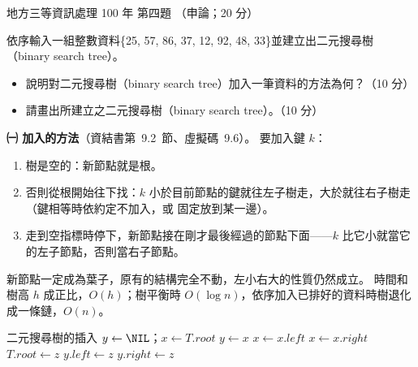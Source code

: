 \begin{pastexam}[label={px:df3-100-ds-04}]{地方三等資訊處理 100 年 第四題}
（申論；20 分）

依序輸入一組整數資料\{25, 57, 86, 37, 12, 92, 48, 33\}並建立出二元搜尋樹（binary search tree）。
\begin{itemize}[leftmargin=2.2em, nosep]
\item[㈠] 說明對二元搜尋樹（binary search tree）加入一筆資料的方法為何？（10 分）
\item[㈡] 請畫出所建立之二元搜尋樹（binary search tree）。（10 分）
\end{itemize}
\end{pastexam}

\begin{pastsoln}
\textbf{㈠ 加入的方法}（資結書第~9.2~節、虛擬碼~9.6）。 要加入鍵 $k$：
\begin{enumerate}
\item 樹是空的：新節點就是根。
\item 否則從根開始往下找：$k$ 小於目前節點的鍵就往左子樹走，大於就往右子樹走（鍵相等時依約定不加入，或
固定放到某一邊）。
\item 走到空指標時停下，新節點接在剛才最後經過的節點下面——$k$ 比它小就當它的左子節點，否則當右子節點。
\end{enumerate}
新節點一定成為葉子，原有的結構完全不動，左小右大的性質仍然成立。 時間和樹高 $h$ 成正比，$O(h)$；樹平衡時
$O(\log n)$，依序加入已排好的資料時樹退化成一條鏈，$O(n)$。
\begin{pseudo}{二元搜尋樹的插入}
 
    \State $y \gets \NIL$；$x \gets T.\mathit{root}$
        \State $y \gets x$
            \State $x \gets x.\mathit{left}$
        \Else
            \State $x \gets x.\mathit{right}$
        \EndIf
    \EndWhile
        \State $T.\mathit{root} \gets z$ 
        \State $y.\mathit{left} \gets z$
    \Else
        \State $y.\mathit{right} \gets z$
    \EndIf
\EndProcedure
\end{pseudo}


\end{pastsoln}
